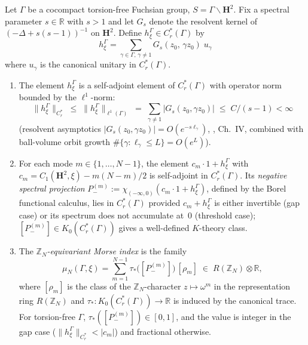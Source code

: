 \begin{theorem}
\label{thm:kk-product}
Let $\Gamma$ be a cocompact torsion-free Fuchsian group,
$S = \Gamma\backslash\mathbf{H}^2$.
Fix a spectral parameter $s \in \mathbb{R}$ with $s > 1$
and let $G_s$ denote the resolvent kernel of
$(-\Delta + s(s{-}1))^{-1}$ on $\mathbf{H}^2$.
Define $h_\xi^\Gamma \in C^*_r(\Gamma)$ by
\begin{equation}\label{eq:h-element}
  h_\xi^\Gamma
  = \sum_{\gamma \in \Gamma,\, \gamma \ne 1}
    G_s(z_0,\, \gamma z_0)\; u_\gamma
\end{equation}
where $u_\gamma$ is the canonical unitary in $C^*_r(\Gamma)$.
\begin{enumerate}
  \item The element $h_\xi^\Gamma$ is a self-adjoint element
    of $C^*_r(\Gamma)$ with operator norm bounded by the $\ell^1$-norm:
    \begin{equation}\label{eq:op-norm-bound}
      \|h_\xi^\Gamma\|_{C^*_r}
      \;\le\; \|h_\xi^\Gamma\|_{\ell^1(\Gamma)}
      \;=\; \sum_{\gamma \ne 1} |G_s(z_0, \gamma z_0)|
      \;\le\; C/(s{-}1) < \infty
    \end{equation}
    (resolvent asymptotics
    $|G_s(z_0,\gamma z_0)| = O(e^{-s\ell_\gamma})$,
    \citealt{Helgason1984}, Ch.~IV, combined with
    ball-volume orbit growth
    $\#\{\gamma : \ell_\gamma \le L\} = O(e^L)$).
  \item For each mode $m \in \{1, \ldots, N{-}1\}$, the element
    $c_m\cdot 1 + h_\xi^\Gamma$ with
    $c_m = C_1(\mathbf{H}^2,\xi) - m(N{-}m)/2$
    is self-adjoint in $C^*_r(\Gamma)$.
    Its \emph{negative spectral projection}
    $P_-^{(m)} := \chi_{(-\infty,0)}(c_m\cdot 1 + h_\xi^\Gamma)$,
    defined by the Borel functional calculus,
    lies in $C^*_r(\Gamma)$ provided $c_m + h_\xi^\Gamma$
    is either invertible (gap case) or its spectrum does
    not accumulate at~$0$ (threshold case);
    $[P_-^{(m)}] \in K_0(C^*_r(\Gamma))$ gives a
    well-defined $K$-theory class.
  \item The \emph{$\mathbb{Z}_N$-equivariant Morse index}
    is the family
    \begin{equation}\label{eq:kasparov-product}
      \mu_N(\Gamma,\xi)
      = \sum_{m=1}^{N-1}
        \tau_*\bigl([P_-^{(m)}]\bigr)\,[\rho_m]
      \;\in\; R(\mathbb{Z}_N) \otimes \mathbb{R},
    \end{equation}
    where $[\rho_m]$ is the class of the $\mathbb{Z}_N$-character
    $z \mapsto \omega^m$ in the representation ring $R(\mathbb{Z}_N)$
    and $\tau_* \colon K_0(C^*_r(\Gamma)) \to \mathbb{R}$ is induced
    by the canonical trace.
    For torsion-free $\Gamma$, $\tau_*([P_-^{(m)}]) \in [0,1]$,
    and the value is integer in the gap case
    ($\|h_\xi^\Gamma\|_{C^*_r} < |c_m|$)
    and fractional otherwise.
\end{enumerate}
\end{theorem}

